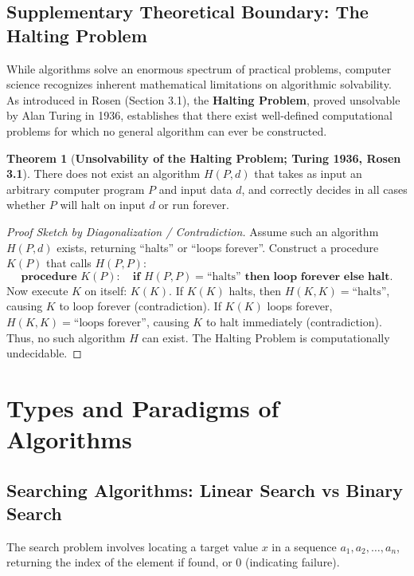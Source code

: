 \documentclass[10pt,a4paper]{article}
\theoremstyle{definition}
\newtheorem{theorem}{Theorem}[section]
\begin{document}
\subsection{Supplementary Theoretical Boundary: The Halting Problem}
While algorithms solve an enormous spectrum of practical problems, computer science recognizes inherent mathematical limitations on algorithmic solvability. As introduced in Rosen (Section 3.1), the \textbf{Halting Problem}, proved unsolvable by Alan Turing in 1936, establishes that there exist well-defined computational problems for which no general algorithm can ever be constructed.

\begin{theorem}[\textbf{Unsolvability of the Halting Problem; Turing 1936, Rosen 3.1}]
There does not exist an algorithm $H(P, d)$ that takes as input an arbitrary computer program $P$ and input data $d$, and correctly decides in all cases whether $P$ will halt on input $d$ or run forever.
\end{theorem}

\begin{proof}[Proof Sketch by Diagonalization / Contradiction]
Assume such an algorithm $H(P, d)$ exists, returning ``halts'' or ``loops forever''. Construct a procedure $K(P)$ that calls $H(P, P)$:
$$\textbf{procedure } K(P): \quad \textbf{if } H(P, P) = \text{``halts''} \textbf{ then loop forever else halt}.$$
Now execute $K$ on itself: $K(K)$. If $K(K)$ halts, then $H(K, K) = \text{``halts''}$, causing $K$ to loop forever (contradiction). If $K(K)$ loops forever, $H(K, K) = \text{``loops forever''}$, causing $K$ to halt immediately (contradiction). Thus, no such algorithm $H$ can exist. The Halting Problem is computationally undecidable.
\end{proof}

\section{Types and Paradigms of Algorithms}

\subsection{Searching Algorithms: Linear Search vs Binary Search}
The search problem involves locating a target value $x$ in a sequence $a_1, a_2, \dots, a_n$, returning the index of the element if found, or 0 (indicating failure).
\end{document}
